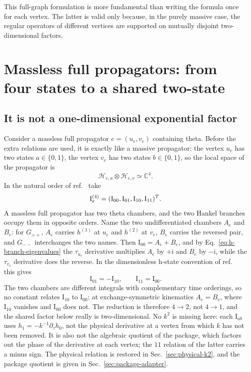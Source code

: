 \documentclass[11pt,a4paper]{article}
\newcommand{\ii}{\mathrm i}
\newcommand{\cH}{\mathcal H}
\begin{document}
This full-graph formulation is more fundamental than writing the formula once for each vertex. The latter is valid only because, in the purely massive case, the regular operators of different vertices are supported on mutually disjoint two-dimensional factors.

\section{Massless full propagators: from four states to a shared two-state}
\label{sec:massless-full-edge}

\subsection{It is not a one-dimensional exponential factor}

Consider a massless full propagator $e=(u_e,v_e)$ containing theta. Before the extra relations are used, it is exactly like a massive propagator: the vertex $u_e$ has two states $a\in\{0,1\}$, the vertex $v_e$ has two states $b\in\{0,1\}$, so the local space of the propagator is
\begin{equation}
 \cH_{e,u}\otimes\cH_{e,v}\simeq\mathbb C^4.
\end{equation}
In the natural order of ref.~\cite{Chen:2023eic} take
\begin{equation}
 \bm{\text I}_e^{(4)}
 =(\text{I}_{00},\text{I}_{01},\text{I}_{10},\text{I}_{11})^T.
\end{equation}
A massless full propagator has two theta chambers, and the two Hankel branches occupy them in opposite orders. Name the two undifferentiated chambers $A_e$ and $B_e$: for $G_{++}$, $A_e$ carries $h^{(1)}$ at $u_e$ and $h^{(2)}$ at $v_e$, $B_e$ carries the reversed pair, and $G_{--}$ interchanges the two names. Then $\text{I}_{00}=A_e+B_e$, and by Eq.~\eqref{eq:h-branch-eigenvalues} the $\tau_{u_e}$ derivative multiplies $A_e$ by $+\ii$ and $B_e$ by $-\ii$, while the $\tau_{v_e}$ derivative does the reverse. In the dimensionless h-state convention of ref.~\cite{Chen:2023eic} this gives
\begin{equation}
 \text{I}_{01}=-\text{I}_{10},
 \qquad
 \text{I}_{11}=\text{I}_{00}.
 \label{eq:h-state-massless-relations}
\end{equation}
The two chambers are different integrals with complementary time orderings, so no constant relates $\text{I}_{10}$ to $\text{I}_{00}$: at exchange-symmetric kinematics $A_e=B_e$, where $\text{I}_{10}$ vanishes and $\text{I}_{00}$ does not. The reduction is therefore $4\to2$, not $4\to1$, and the shared factor below really is two-dimensional.
No $k^2$ is missing here: each $\text{I}_{ab}$ uses $h_1=-k^{-1}\partial_\tau h_0$, not the physical derivative at a vertex from which $k$ has not been removed. It is also not the algebraic quotient of the package, which factors out the phase of the derivative at each vertex; the $11$ relation of the latter carries a minus sign. The physical relation is restored in Sec.~\ref{sec:physical-k2}, and the package quotient is given in Sec.~\ref{sec:package-adapter}.
\end{document}

